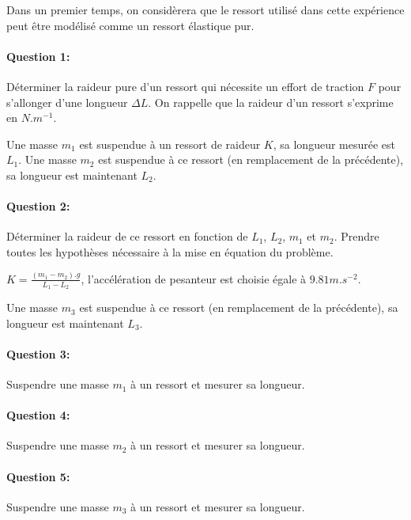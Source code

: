 




Dans un premier temps, on considèrera que le ressort utilisé dans cette expérience peut être modélisé comme un ressort élastique pur. 

\paragraph{Question 1:} Déterminer la raideur pure d'un ressort qui nécessite un effort de traction $F$ pour s'allonger d'une longueur $\Delta L$. On rappelle que la raideur d'un ressort s'exprime en $N.m^{-1}$.

Une masse $m_1$ est suspendue à un ressort de raideur $K$, sa longueur mesurée est $L_1$. Une masse $m_2$ est suspendue à ce ressort (en remplacement de la précédente), sa longueur est maintenant $L_2$.

\paragraph{Question 2:} Déterminer la raideur de ce ressort en fonction de $L_1$, $L_2$, $m_1$ et $m_2$. Prendre toutes les hypothèses nécessaire à la mise en équation du problème.

$K=\frac{(m_1-m_2).g}{L_1-L_2}$, l'accélération de pesanteur est choisie égale à $9.81m.s^{-2}$.

Une masse $m_3$ est suspendue à ce ressort (en remplacement de la précédente), sa longueur est maintenant $L_3$.


\paragraph{Question 3:} Suspendre une masse $m_1$ à un ressort et mesurer sa longueur.

\paragraph{Question 4:} Suspendre une masse $m_2$ à un ressort et mesurer sa longueur.

\paragraph{Question 5:} Suspendre une masse $m_3$ à un ressort et mesurer sa longueur.

